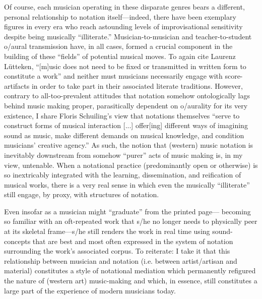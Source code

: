     Of course, each musician operating in these disparate genres bears a different, personal relationship to notation itself---indeed, there have been exemplary figures in every era who reach astounding levels of improvisational sensitivity despite being musically ``illiterate.'' Musician-to-musician and teacher-to-student o/aural transmission have, in all cases, formed a crucial component in the building of these ``fields'' of potential musical moves. To again cite Laurenz L\"utteken, ``[m]usic does not need to be fixed or transmitted in written form to constitute a work'' and neither must musicians necessarily engage with score-artifacts in order to take part in their associated literate traditions.\autocite{Lutteken_2020} However, contrary to all-too-prevalent attitudes that notation somehow ontologically lags behind music making proper, parasitically dependent on o/aurality for its very existence, I share Floris Schuiling's view that notations themselves ``serve to construct forms of musical interaction [...] offer[ing] different ways of imagining sound as music, make different demands on musical knowledge, and condition musicians' creative agency.''\autocite[431]{Schuiling_2019} As such, the notion that (western) music notation is inevitably downstream from somehow ``purer'' acts of music making is, in my view, untenable. When a notational practice (predominantly open or otherwise) is so inextricably integrated with the learning, dissemination, and reification of musical works, there is a very real sense in which even the musically ``illiterate'' still engage, by proxy, with structures of notation. 

    Even insofar as a musician might ``graduate'' from the printed page--- becoming so familiar with an oft-repeated work that s/he no longer needs to physically peer at its skeletal frame---s/he still renders the work in real time using sound-concepts that are best and most often expressed in the system of notation surrounding the work's associated corpus. To reiterate: I take it that this relationship between musician and notation (i.e. between artist/artisan and material) constitutes a style of notational mediation which permanently refigured the nature of (western art) music-making and which, in essence, still constitutes a large part of the experience of modern musicians today. 
    

